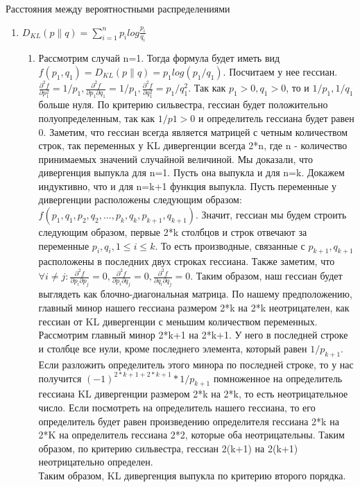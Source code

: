 \documentclass[12pt]{extreport}
\theoremstyle{definiton}
\theoremstyle{definition}
\theoremstyle{definition}
\let\leq\leqslant
\begin{document}
    \PR[] Расстояния между вероятностными распределениями
    \begin{enumerate}
    \item $D_{KL}(p\|q)=\sum_{i=1}^np_i log\frac{p_i}{q_i}$
        \begin{enumerate}
            \item Рассмотрим случай n=1. Тогда формула будет иметь вид $f(p_1,q_1) = D_{KL}(p\|q)=p_1log(p_1/q_1)$. Посчитаем у нее гессиан. $\frac{\partial^2 f}{\partial p_1^2} = 1/p_1, \frac{\partial^2 f}{\partial p_1 \partial q_1} = 1/p_1, \frac{\partial^2 f}{\partial q_1^2} = p_1/q_1^2$. Так как $p_1 > 0, q_1 >0$, то и $1/p_1, 1/q_1$ больше нуля. По критерию сильвестра, гессиан будет положительно полуопределенным, так как $1/p1 >0$ и определитель гессиана будет равен 0. Заметим, что гессиан всегда является матрицей с четным количеством строк, так переменных у KL дивергенции  всегда 2*n, где n - количество принимаемых значений случайной величиной. Мы доказали, что дивергенция выпукла для n=1. Пусть она выпукла и для n=k. Докажем индуктивно, что и для n=k+1 функция выпукла. Пусть переменные у дивергенции расположены следующим образом: $f(p_1,q_1,p_2,q_2,...,p_k,q_k,p_{k+1},q_{k+1})$. Значит, гессиан мы будем строить следующим образом, первые 2*k столбцов и строк отвечают за переменные $p_i,q_i, 1 \leq i \leq k$. То есть производные, связанные с $p_{k+1},q_{k+1}$ расположены в последних двух строках гессиана. Также заметим, что $\forall i \neq j: \frac{\partial^2 f}{\partial p_i \partial p_j} = 0, \frac{\partial^2 f}{\partial p_i \partial q_j} = 0,\frac{\partial^2 f}{\partial q_i \partial q_j} = 0$. Таким образом, наш гессиан будет выглядеть как блочно-диагональная матрица. По нашему предположению, главный минор нашего гессиана размером 2*k на 2*k неотрицателен, как гессиан от KL дивергенции с меньшим количеством переменных. Рассмотрим главный минор 2*k+1 на 2*k+1. У него в последней строке и столбце все нули, кроме последнего элемента, который равен $1/p_{k+1}$. Если разложить определитель этого минора по последней строке, то у нас получится $(-1)^{2*k+1 + 2*k + 1} * 1/p_{k+1}$ помноженное на определитель гессиана KL дивергенции размером 2*k на 2*k, то есть неотрицательное число. Если посмотреть на определитель нашего гессиана, то его определитель будет равен произведению определителя гессиана 2*k на 2*K на определитель гессиана 2*2, которые оба неотрицательны. Таким образом, по критерию сильвестра, гессиан 2(k+1) на 2(k+1) неотрицательно определен.
            \\Таким образом, KL дивергенция выпукла по критерию второго порядка.

\end{enumerate}
\end{enumerate}
\end{document}
